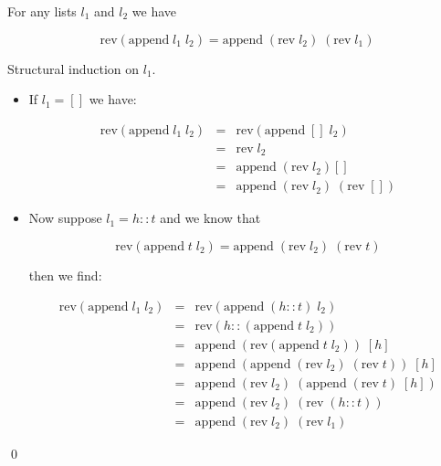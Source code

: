 \begin{lemma}

For any lists $l_1$ and $l_2$ we have

$$\mbox{rev}(\mbox{append}\; l_1\; l_2) = \mbox{append}\; (\mbox{rev}\;
l_2)\; (\mbox{rev}\; l_1)$$

\proof Structural induction on $l_1$.

\begin{itemize}

\item If $l_1 = []$ we have:

\begin{eqnarray*}
\mbox{rev}(\mbox{append}\; l_1\; l_2)
& = & \mbox{rev}(\mbox{append}\; []\; l_2)                          \\
& = & \mbox{rev}\; l_2                                              \\
& = & \mbox{append}\; (\mbox{rev}\; l_2) []                         \\
& = & \mbox{append}\; (\mbox{rev}\; l_2)\; (\mbox{rev}\; [])
\end{eqnarray*}

\item Now suppose $l_1 = h::t$ and we know that

$$\mbox{rev}(\mbox{append}\; t\; l_2) = \mbox{append}\; (\mbox{rev}\;
l_2)\; (\mbox{rev}\; t)$$

\noindent then we find:

\begin{eqnarray*}
\mbox{rev}(\mbox{append}\; l_1\; l_2)
& = & \mbox{rev}(\mbox{append}\; (h::t)\; l_2)                      \\
& = & \mbox{rev}(h::(\mbox{append}\; t\; l_2))                      \\
& = & \mbox{append}\; (\mbox{rev}(\mbox{append}\; t\; l_2))\; [h]   \\
& = & \mbox{append}\; (\mbox{append}\; (\mbox{rev}\; l_2)\; (\mbox{rev}\; t))\; [h]                                             \\
& = & \mbox{append}\; (\mbox{rev}\; l_2)\; (\mbox{append}\; (\mbox{rev}\; t)\; [h])                                             \\
& = & \mbox{append}\; (\mbox{rev}\; l_2)\; (\mbox{rev}\; (h::t))\\
& = & \mbox{append}\; (\mbox{rev}\; l_2)\; (\mbox{rev}\; l_1)
\end{eqnarray*}

\end{itemize}

\qed

\end{lemma}




